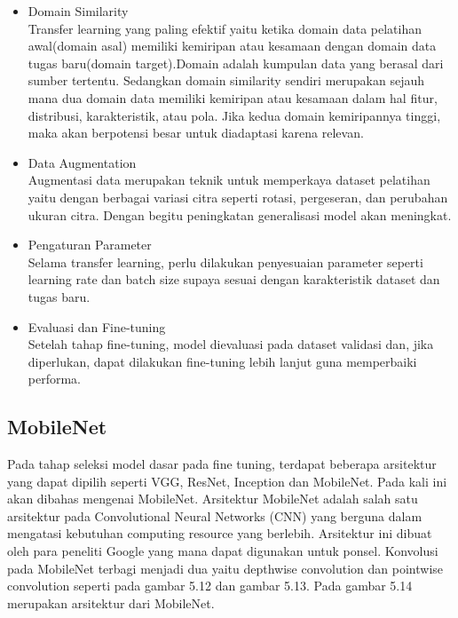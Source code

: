 \documentclass[
  letterpaper,
  DIV=11,
  numbers=noendperiod]{scrreprt}
\begin{document}
\begin{itemize}
\item
  Domain Similarity\\
  Transfer learning yang paling efektif yaitu ketika domain data
  pelatihan awal(domain asal) memiliki kemiripan atau kesamaan dengan
  domain data tugas baru(domain target).Domain adalah kumpulan data yang
  berasal dari sumber tertentu. Sedangkan domain similarity sendiri
  merupakan sejauh mana dua domain data memiliki kemiripan atau kesamaan
  dalam hal fitur, distribusi, karakteristik, atau pola. Jika kedua
  domain kemiripannya tinggi, maka akan berpotensi besar untuk
  diadaptasi karena relevan.
\item
  Data Augmentation\\
  Augmentasi data merupakan teknik untuk memperkaya dataset pelatihan
  yaitu dengan berbagai variasi citra seperti rotasi, pergeseran, dan
  perubahan ukuran citra. Dengan begitu peningkatan generalisasi model
  akan meningkat.
\item
  Pengaturan Parameter\\
  Selama transfer learning, perlu dilakukan penyesuaian parameter
  seperti learning rate dan batch size supaya sesuai dengan
  karakteristik dataset dan tugas baru.
\item
  Evaluasi dan Fine-tuning\\
  Setelah tahap fine-tuning, model dievaluasi pada dataset validasi dan,
  jika diperlukan, dapat dilakukan fine-tuning lebih lanjut guna
  memperbaiki performa.
\end{itemize}

\hypertarget{mobilenet}{%
\subsection*{MobileNet}\label{mobilenet}}

Pada tahap seleksi model dasar pada fine tuning, terdapat beberapa
arsitektur yang dapat dipilih seperti VGG, ResNet, Inception dan
MobileNet. Pada kali ini akan dibahas mengenai MobileNet. Arsitektur
MobileNet adalah salah satu arsitektur pada Convolutional Neural
Networks (CNN) yang berguna dalam mengatasi kebutuhan computing resource
yang berlebih. Arsitektur ini dibuat oleh para peneliti Google yang mana
dapat digunakan untuk ponsel. Konvolusi pada MobileNet terbagi menjadi
dua yaitu depthwise convolution dan pointwise convolution seperti pada
gambar 5.12 dan gambar 5.13. Pada gambar 5.14 merupakan arsitektur dari
MobileNet.
\end{document}
